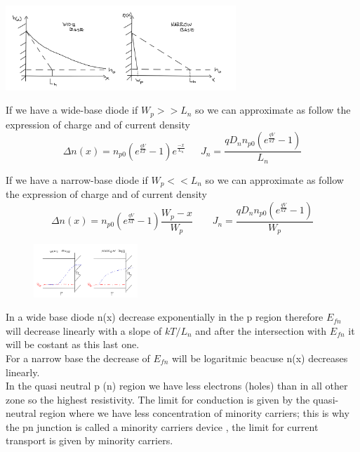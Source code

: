 \centering
\includegraphics[width=0.65\textwidth]{pn12.png}\\
\raggedright

If we have a wide-base diode if $W_p>>L_n$ so we can approximate as follow the expression of charge and of current density 
\begin{equation}
\Delta n(x)=n_{p0}(e^{\frac{qV}{kT}}-1)e^{\frac{-x}{L_n}} \ \ \ \ \ \ \ J_n=\frac{qD_nn_{p0}(e^{\frac{qV}{kT}}-1)}{L_n}
\end{equation}


If we have a narrow-base diode if $W_p<<L_n$ so we can approximate as follow the expression of charge and of current density
\begin{equation}
\Delta n(x)=n_{p0}(e^{\frac{qV}{kT}}-1)\frac{W_p-x}{W_p}\ \ \ \ \ \ \ \ \ J_n=\frac{qD_nn_{p0}(e^{\frac{qV}{kT}}-1)}{W_p}
\end{equation}


\begin{figure}
\includegraphics[width=0.35\textwidth]{wbnb.png}
\end{figure}

In a wide base diode n(x) decrease exponentially in the p region therefore $E_{fn}$ will decrease linearly with a slope of $kT/L_n$ and after the intersection with $E_{fn}$ it will be costant as this last one.\\
For a narrow base the decrease of $E_{fn}$ will be logaritmic beacuse n(x) decreases linearly.\\
In the quasi neutral p (n) region we have less electrons (holes) than in all other zone so the highest resistivity. The limit for conduction is given by the quasi-neutral region where we have less concentration of minority carriers; this is why the pn junction is called a minority carriers device , the limit for current transport is given by minority carriers.\\

